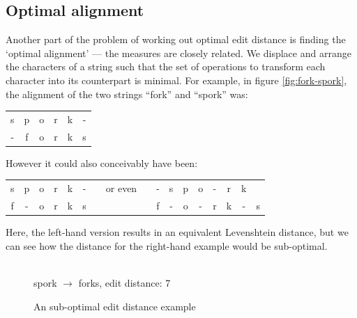 \subsection*{Optimal alignment}
Another part of the problem of working out optimal edit distance is
finding the `optimal alignment' --- the measures are closely
related. We displace and arrange the characters of a string such that
the set of operations to transform each character into its counterpart
is minimal. For example, in figure \ref{fig:fork-spork}, the alignment
of the two strings ``fork'' and ``spork'' was:

\begin{center}
  \begin{tabular}{cccccc}
    s & p & o & r & k & -\\
    - & f & o & r & k & s 
  \end{tabular}
\end{center}

However it could also conceivably have been:

\begin{center}
  \begin{tabular}{ccccccccccccccccc}
    s & p & o & r & k & - & & or even & & - & s & p & o & - & r & k &\\
    f & - & o & r & k & s & &         & & f & - & o & - & r & k & - & s    
  \end{tabular}
\end{center}

Here, the left-hand version results in an equivalent
Levenshtein distance, but we can see how the distance for the
right-hand example would be sub-optimal.

\begin{figure}[h]
  \centering   
  \\
  \vspace{3 mm}
  spork $\rightarrow$ forks, edit distance: 7
  \caption{An sub-optimal edit distance example}
  \label{fig:fork-spork-subopt}
\end{figure}

